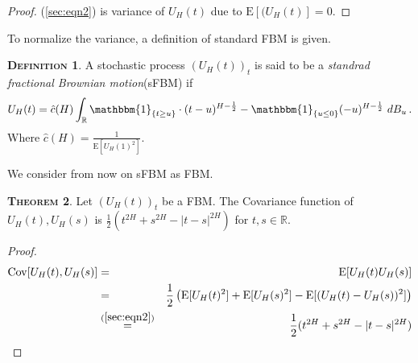 \documentclass[a4paper, twoside, 11pt]{article}
\theoremstyle{definition}
\newtheorem{definition}{\scshape Definition}[section]
\newtheorem{theorem}[definition]{\scshape Theorem}
\newcommand{\brkt}[1]{\left({#1} \right)}
\begin{document}
\begin{proof}
  (\ref{sec:eqn2}) is variance of $U_H(t)$ due to $\mathrm{E}[(U_H(t)] = 0$.
\end{proof}
To normalize the variance, a definition of standard FBM is given.

\begin{definition}
  A stochastic process $(U_H(t))_{t}$ is said to be a \emph{standrad fractional Brownian motion}(sFBM) if
  \begin{equation}
U_H(t) = \hat{c}(H) \int_{\mathbb{R}} \mathbbm{1}_{\{t\ge u\}}\cdot (t-u)^{H-\frac{1}{2}} - \mathbbm{1}_{\{u\le 0\}} (-u)^{H-\frac{1}{2}} \, \mathop{dB_u}.
\label{sec:eqn3}
\end{equation}
Where $\hat{c}(H) = \frac{1}{\mathrm{E}[U_H(1)^2]} $.
\end{definition}
We consider from now on sFBM as FBM.

\begin{theorem}
  Let  $(U_H(t))_{t}$ be a FBM. The Covariance function of $U_H(t), U_H(s)$ is $ \frac{1}{2}(t^{2H} + s^{2H} - |t-s|^{2H})$ for $t, s \in \mathbb{R}$.
\end{theorem}

\begin{proof}
  \begin{eqnarray}
	\mathrm{Cov}[U_H(t), U_H(s)] &=& \mathrm{E}[U_H(t)U_H(s)] \nonumber\\
	&=& \frac{1}{2}\brkt{\mathrm{E}[U_H(t)^2] + \mathrm{E}[U_H(s)^2] - \mathrm{E}[(U_H(t) - U_H(s))^2]} \nonumber\\
	&\overset{(\ref{sec:eqn2})}{=}& \frac{1}{2}(t^{2H} + s^{2H} - |t-s|^{2H})
	\label{sec:eqn4}
  \end{eqnarray}
\end{proof}
\end{document}
